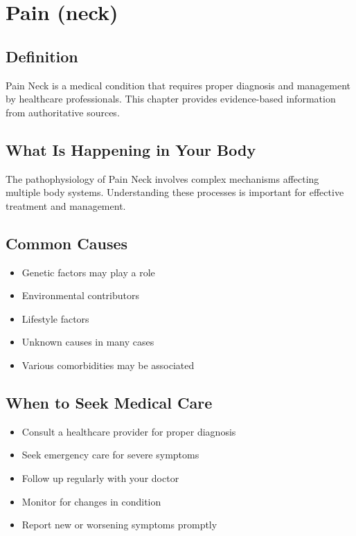 
\chapter{Pain (neck)}

\section*{Definition}
Pain Neck is a medical condition that requires proper diagnosis and management by healthcare professionals. This chapter provides evidence-based information from authoritative sources.

\section*{What Is Happening in Your Body}
The pathophysiology of Pain Neck involves complex mechanisms affecting multiple body systems. Understanding these processes is important for effective treatment and management.

\section*{Common Causes}
\begin{itemize}
  \item Genetic factors may play a role
  \item Environmental contributors
  \item Lifestyle factors
  \item Unknown causes in many cases
  \item Various comorbidities may be associated
\end{itemize}

\section*{When to Seek Medical Care}
\begin{itemize}
  \item Consult a healthcare provider for proper diagnosis
  \item Seek emergency care for severe symptoms
  \item Follow up regularly with your doctor
  \item Monitor for changes in condition
  \item Report new or worsening symptoms promptly
\end{itemize}

